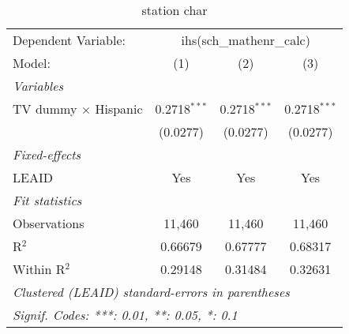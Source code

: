 \begin{table}[htbp]
\centering
\caption{station char}
\begin{tabular}{lccc}
\tabularnewline\midrule\midrule
Dependent Variable:&\multicolumn{3}{c}{ihs(sch\_mathenr\_calc)}\\
Model:&(1) & (2) & (3)\\
\midrule \emph{Variables}&   &   &  \\
TV dummy $\times$ Hispanic & 0.2718$^{***}$ & 0.2718$^{***}$ & 0.2718$^{***}$\\
  &(0.0277) & (0.0277) & (0.0277)\\
\midrule \emph{Fixed-effects}&   &   &  \\
LEAID & Yes & Yes & Yes\\
\midrule \emph{Fit statistics}&  & & \\
Observations & 11,460&11,460&11,460\\
R$^2$ & 0.66679&0.67777&0.68317\\
Within R$^2$ & 0.29148&0.31484&0.32631\\
\midrule\midrule\multicolumn{4}{l}{\emph{Clustered (LEAID) standard-errors in parentheses}}\\
\multicolumn{4}{l}{\emph{Signif. Codes: ***: 0.01, **: 0.05, *: 0.1}}\\
\end{tabular}
\end{table}


